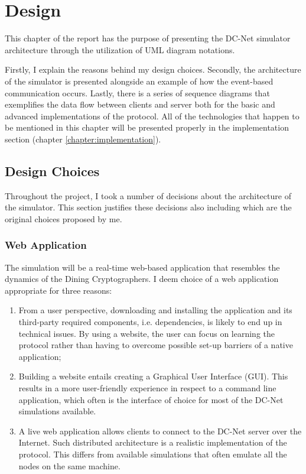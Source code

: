 \chapter{Design} \label{chapter:design}
This chapter of the report has the purpose of presenting the DC-Net simulator architecture through the utilization of UML diagram notations.

Firstly, I explain the reasons behind my design choices. Secondly, the architecture of the simulator is presented alongside an example of how the event-based communication occurs. Lastly, there is a series of sequence diagrams that exemplifies the data flow between clients and server both for the basic and advanced implementations of the protocol. All of the technologies that happen to be mentioned in this chapter will be presented properly in the implementation section (chapter \ref{chapter:implementation}).


\section{Design Choices}
Throughout the project, I took a number of decisions about the architecture of the simulator. This section justifies these decisions also including which are the original choices proposed by me. 

\subsection{Web Application}
The simulation will be a real-time web-based application that resembles the dynamics of the Dining Cryptographers. I deem choice of a web application appropriate for three reasons:
\begin{enumerate}
    \item From a user perspective, downloading and installing the application and its third-party required components, i.e. dependencies, is likely to end up in technical issues. By using a website, the user can focus on learning the protocol rather than having to overcome possible set-up barriers of a native application;
    \item Building a website entails creating a Graphical User Interface (GUI). This results in a more user-friendly experience in respect to a command line application, which often is the interface of choice for most of the DC-Net simulations available.
    \item A live web application allows clients to connect to the DC-Net server over the Internet. Such distributed architecture is a realistic implementation of the protocol. This differs from available simulations that often emulate all the nodes on the same machine.
\end{enumerate}

